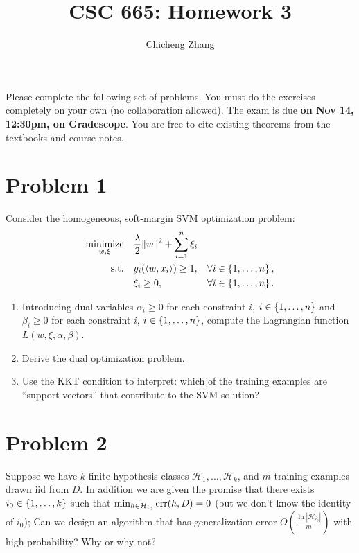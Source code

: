 \documentclass{article}
\title{CSC 665: Homework 3}
\author{Chicheng Zhang}
\DeclareMathOperator*{\err}{{\rm err}}
\DeclareMathOperator*{\minimize}{{\rm minimize}}
\DeclareMathOperator*{\st}{{\rm s.t.}}
\newcommand{\Xcal}{\mathcal{X}} %
\newcommand{\Ycal}{\mathcal{Y}} %
\newcommand{\Hcal}{\mathcal{H}} %
\newcommand{\inner}[2]{\left\langle #1,#2 \right\rangle}
\begin{document}
\maketitle

Please complete the following set of problems. You must do the exercises completely on your own (no collaboration allowed).
The exam is due \textbf{on Nov 14, 12:30pm, on Gradescope}. You are free to
cite existing theorems from the textbooks and course notes.


\section*{Problem 1}
Consider the homogeneous, soft-margin SVM optimization problem:
\begin{align}
  \minimize_{w,\xi} \quad & \frac\lambda 2 \| w \|^2 + \sum_{i=1}^n \xi_i & \label{eqn:svm-d} \\
    \st \quad & y_i(\inner{w}{x_i}) \geq 1, &\forall i \in \cbr{1,\ldots,n}, \\
    & \xi_i \geq 0, &\forall i \in \cbr{1,\ldots,n}. \nonumber
\end{align}
\begin{enumerate}
\item Introducing dual variables $\alpha_i \geq 0$ for each constraint $i$, $i \in \cbr{1,\ldots,n}$ and $\beta_i \geq 0$ for each constraint $i$, $i \in \cbr{1,\ldots,n}$,
compute the Lagrangian function $L(w,\xi,\alpha,\beta)$.

\item Derive the dual optimization problem.

\item Use the KKT condition to interpret: which of the training examples are ``support vectors'' that contribute to the SVM solution?

\end{enumerate}

\section*{Problem 2}
Suppose we have $k$ finite hypothesis classes $\Hcal_1, \ldots, \Hcal_k$, and $m$ training examples drawn iid from $D$. In addition we are given the promise that there exists $i_0 \in \cbr{1,\ldots,k}$ such that $\min_{h \in \Hcal_{i_0}} \err(h, D) = 0$ (but we don't know the identity of $i_0$); Can we design an algorithm that has generalization error $O(\frac{\ln|\Hcal_{i_0}|}{m})$ with high probability? Why or why not?
\end{document}
